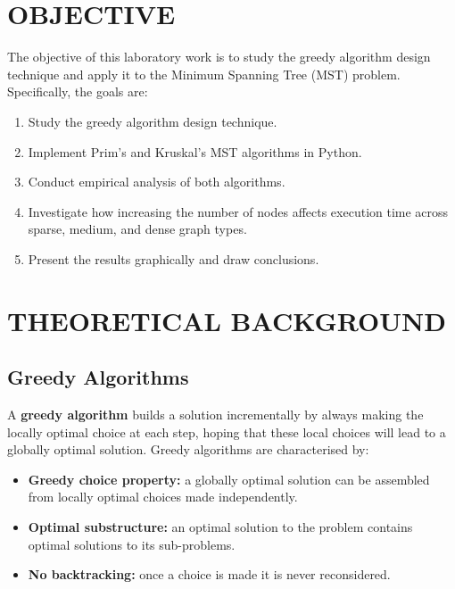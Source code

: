 \documentclass[12pt]{article}
\begin{document}
\clearpage
\setcounter{page}{2}
\pagestyle{fancy}
\fancyhf{}
\rhead{\thepage}

\section*{OBJECTIVE}

\hspace{0.8cm} The objective of this laboratory work is to study the greedy algorithm
design technique and apply it to the Minimum Spanning Tree (MST) problem.
Specifically, the goals are:

\begin{enumerate}
  \item Study the greedy algorithm design technique.
  \item Implement Prim's and Kruskal's MST algorithms in Python.
  \item Conduct empirical analysis of both algorithms.
  \item Investigate how increasing the number of nodes affects execution time
        across sparse, medium, and dense graph types.
  \item Present the results graphically and draw conclusions.
\end{enumerate}

\section*{THEORETICAL BACKGROUND}

\subsection*{Greedy Algorithms}

\hspace{0.8cm} A \textbf{greedy algorithm} builds a solution incrementally by always
making the locally optimal choice at each step, hoping that these local choices will
lead to a globally optimal solution. Greedy algorithms are characterised by:

\begin{itemize}
  \item \textbf{Greedy choice property:} a globally optimal solution can be assembled
        from locally optimal choices made independently.
  \item \textbf{Optimal substructure:} an optimal solution to the problem contains
        optimal solutions to its sub-problems.
  \item \textbf{No backtracking:} once a choice is made it is never reconsidered.
\end{itemize}
\end{document}

